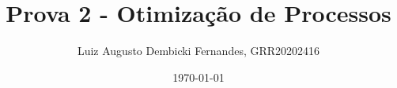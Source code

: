 \documentclass[]{article} %
\begin{document}
\title{Prova 2 - Otimização de Processos}
\author{Luiz Augusto Dembicki Fernandes, GRR20202416}
\date{\today}
\maketitle
\end{document}
